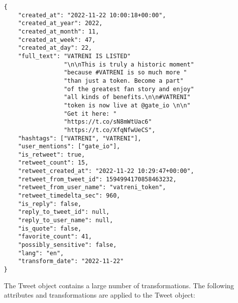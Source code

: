 \begin{code}
\label{subsubsec:sdlc-analysis-data-transformations:transform-tweet}
\begin{verbatim}
{
    "created_at": "2022-11-22 10:00:18+00:00",
    "created_at_year": 2022,
    "created_at_month": 11,
    "created_at_week": 47,
    "created_at_day": 22,
    "full_text": "VATRENI IS LISTED"
                 "\n\nThis is truly a historic moment"
                 "because #VATRENI is so much more "
                 "than just a token. Become a part"
                 "of the greatest fan story and enjoy"
                 "all kinds of benefits.\n\n#VATRENI"
                 "token is now live at @gate_io \n\n"
                 "Get it here: "
                 "https://t.co/sN8mWtUac6"
                 "https://t.co/XfqNfwUeCS",
    "hashtags": ["VATRENI", "VATRENI"],
    "user_mentions": ["gate_io"],
    "is_retweet": true,
    "retweet_count": 15,
    "retweet_created_at": "2022-11-22 10:29:47+00:00",
    "retweet_from_tweet_id": 1594994170858463232,
    "retweet_from_user_name": "vatreni_token",
    "retweet_timedelta_sec": 960,
    "is_reply": false,
    "reply_to_tweet_id": null,
    "reply_to_user_name": null,
    "is_quote": false,
    "favorite_count": 41,
    "possibly_sensitive": false,
    "lang": "en",
    "transform_date": "2022-11-22"
}
\end{verbatim}
\end{code}

The Tweet object contains a large number of transformations. The following attributes and transformations are applied to the Tweet object:

